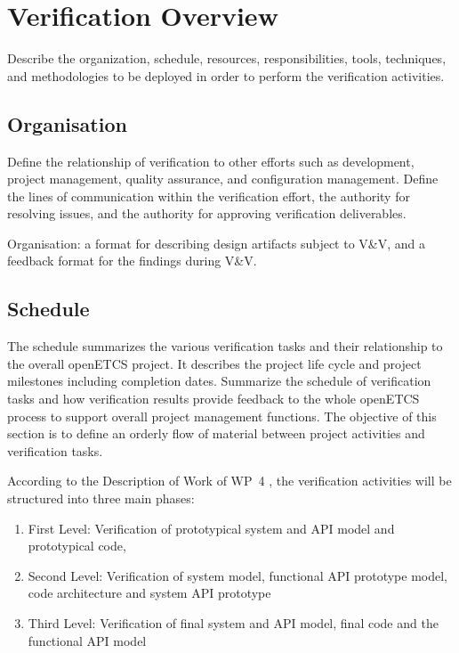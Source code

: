 
\section{Verification Overview}
\label{sec:verif-overv}
Describe the organization, schedule, resources, responsibilities,
tools, techniques, and methodologies to be deployed in order to
perform the verification activities.


\subsection{Organisation}
Define the relationship of verification to other efforts such as
development, project management, quality assurance, and configuration
management. Define the lines of communication within the verification
effort, the authority for resolving issues, and the authority for
approving verification deliverables.

Organisation: a format for describing design artifacts subject to V\&V,
  and a feedback format for the findings during V\&V.

\subsection{Schedule}
The schedule summarizes the various verification tasks and their
relationship to the overall openETCS project.  It describes the
project life cycle and project milestones including completion dates.
Summarize the schedule of verification tasks and how verification
results provide feedback to the whole openETCS process to support
overall project management functions.  The objective of this section
is to define an orderly flow of material between project activities
and verification tasks.

According to the Description of Work of WP~4 \cite{WP4DoW}, the verification
activities will be structured into three main phases: 
\begin{enumerate}
\item First Level: Verification of prototypical system and API model
  and prototypical code,
\item Second Level: Verification of system model, functional API
  prototype model, code architecture and system API prototype
\item Third Level: Verification of final system and API model, final
  code and the functional API model
\end{enumerate}




